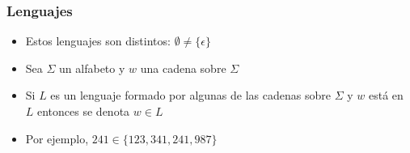 \begin{frame}
  \frametitle{Lenguajes}
      \begin{block}{}
\begin{itemize}[<+->]
\item Estos lenguajes son distintos: $\emptyset \neq \{\epsilon\}$
\item Sea $\Sigma$ un alfabeto y $w$ una cadena sobre $\Sigma$
\item Si $L$ es un lenguaje formado por algunas de las cadenas sobre $\Sigma$ y $w$ está en $L$
entonces se denota $w \in L$ 
\item Por ejemplo, $241 \in \{123, 341, 241, 987\}$
\end{itemize}
			\end{block}
\end{frame}
